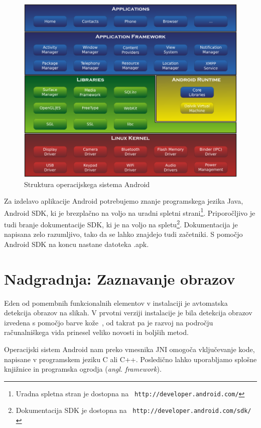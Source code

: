 \documentclass[a4paper, 12pt]{book}
\begin{document}
\begin{figure}
    \centering
    \includegraphics[width=\textwidth]{android}
    \caption{Struktura operacijskega sistema Android~\cite{wiki:Android}}
    \label{picAndroid}
\end{figure}

Za izdelavo aplikacije Android potrebujemo znanje programskega jezika Java,
Android SDK, ki je brezplačno na voljo na uradni spletni
strani\footnote{Uradna spletna stran je dostopna na {\tt
http://developer.android.com/}}. Priporočljivo je tudi branje dokumentacije
SDK, ki je na voljo na spletu\footnote{Dokumentacija SDK je dostopna na {\tt
http://developer.android.com/sdk/}}. Dokumentacija je napisana zelo
razumljivo, tako da se lahko znajdejo tudi začetniki. S pomočjo Android SDK na
koncu nastane datoteka .apk.


\chapter{Nadgradnja: Zaznavanje obrazov}
\label{ch:zaznavanjeObrazov}
Eden od pomembnih funkcionalnih elementov v instalaciji je avtomatska
detekcija  obrazov na slikah. V prvotni verziji instalacije je bila detekcija
obrazov izvedena s pomočjo barve kože~\cite{mirage03,kovac2003illumination}, od takrat pa je razvoj
na področju računalniškega vida prinesel veliko novosti in boljših metod.

Operacijski sistem Android nam preko vmesnika JNI omogoča vklju\-če\-va\-nje
kode, napisane v programskem jeziku C ali C++. Posledično lahko uporabljamo splošne knjižnice in
programska ogrodja (\textit{angl. framework}).
\end{document}
